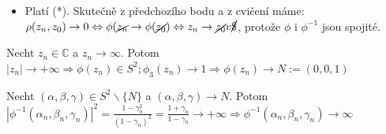 \begin{properties}
\begin{itemize}
    \item Platí (*). Skutečně z předchozího bodu a z cvičení máme: $\rho(z_n,z_0)\rightarrow0\Leftrightarrow\phi(\cancel{z_n}\rightarrow\phi(\cancel{z_0})\Leftrightarrow z_n\rightarrow \cancel{z_0} v \cancel{\$}$, protože $\phi$ i $\phi^{-1}$ jsou spojité.
    \end{itemize}
     \begin{example}
     Necht $z_n\in \mathbb{C}$ a $z_n\rightarrow \infty$. Potom $|z_n|\rightarrow+\infty\Rightarrow \phi(z_n)\in S^2; \phi_3(z_n)\rightarrow 1 \Rightarrow \phi(z_n)\rightarrow N:=(0,0,1)$
     \end{example}
     \begin{example}
     Necht $(\alpha,\beta,\gamma)\in S^2\smallsetminus\{N\}$ a $(\alpha,\beta,\gamma)\rightarrow N$. Potom
     $|\phi^{-1}(\alpha_n,\beta_n,\gamma_n)|^2=\frac{1-\gamma_n^2}{(1-\gamma_n)^2}=\frac{1+\gamma_n}{1-\gamma_n}\rightarrow+\infty\Rightarrow\phi^{-1}(\alpha_n,\beta_n,\gamma_n)\rightarrow\infty$
     
     \end{example}

\end{properties}
